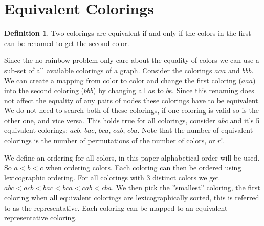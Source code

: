 \documentclass{book}
\theoremstyle{definition}
\newtheorem{definition}{Definition}[section]
\begin{document}
\section{Equivalent Colorings}
\begin{definition}
  Two colorings are equivalent if and only if the colors in the first can be renamed to get the second color.
\end{definition}
Since the no-rainbow problem only care about the equality of colors we can use a sub-set of all available colorings of a graph. Consider the colorings $aaa$ and $bbb$. We can create a mapping from color to color and change the first coloring ($aaa$) into the second coloring ($bbb$) by changing all $a$s to $b$s. Since this renaming does not affect the equality of any pairs of nodes these colorings have to be equivalent. We do not need to search both of these colorings, if one coloring is valid so is the other one, and vice versa. This holds true for all colorings, consider $abc$ and it's 5 equivalent colorings: $acb$, $bac$, $bca$, $cab$, $cba$. Note that the number of equivalent colorings is the number of permutations of the number of colors, or $r!$.

We define an ordering for all colors, in this paper alphabetical order will be used. So $a < b < c$ when ordering colors. Each coloring can then be ordered using lexicographic ordering. For all colorings with 3 distinct colors we get $abc < acb < bac < bca < cab < cba$. We then pick the ''smallest'' coloring, the first coloring when all equivalent colorings are lexicographically sorted, this is referred to as the representative. Each coloring can be mapped to an equivalent representative coloring.
\end{document}
